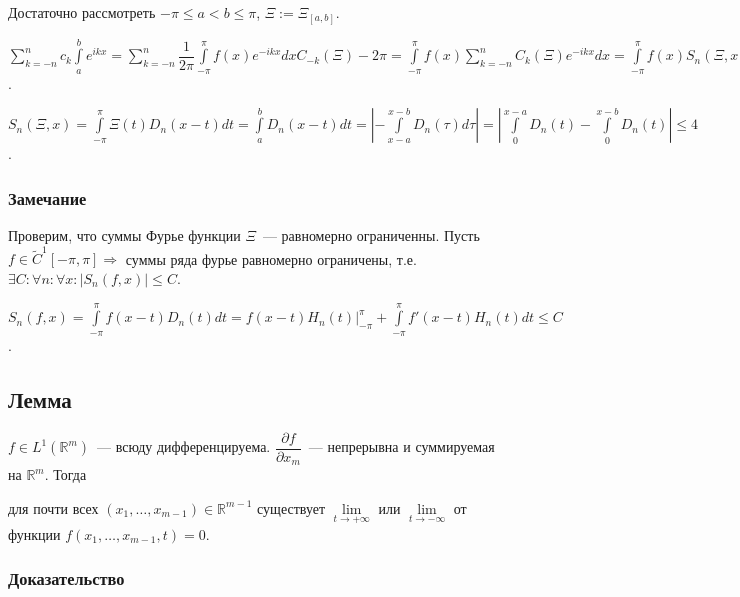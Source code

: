 \documentclass{article}
\begin{document}
            Достаточно рассмотреть $-\pi \leqslant a < b \leqslant \pi$, $\Xi := \Xi_{[a, b]}$.
            
            $\sum\limits_{k = -n}^n c_k \int\limits^b_a e^{ikx} = \sum\limits^n_{k = -n} \dfrac{1}{2 \pi} \int\limits^{\pi}_{-\pi} f(x) e^{-ikx} dx C_{-k} (\Xi) -2 \pi = \int\limits^{\pi}_{-\pi} f(x) \sum\limits_{k = -n}^n C_k(\Xi) e^{-ikx} dx = \int\limits^{\pi}_{-\pi} f(x) S_n(\Xi, x) dx = \int\limits^{\pi}_{-\pi} f(x) S_n(\Xi, x) dx \xrightarrow[n \rightarrow +\infty]{} \int\limits^b_a f(x) dx$.
            
            $S_n(\Xi, x) = \int\limits^{\pi}_{-\pi} \Xi(t) D_n(x - t) dt = \int\limits^b_a D_n(x - t) dt = \left| - \int\limits^{x - b}_{x - a} D_n(\tau) d \tau \right| = \left| \int\limits^{x - a}_0 D_n(t) - \int\limits^{x - b}_0 D_n(t) \right| \leqslant 4$.
            
        \subsubsection{Замечание}
        
            Проверим, что суммы Фурье функции $\Xi$~--- равномерно ограниченны. Пусть $f \in \widetilde{C}^1 [-\pi, \pi] \Rightarrow$ суммы ряда фурье равномерно ограничены, т.е. $\exists C : \forall n : \forall x : \left| S_n(f, x) \right| \leqslant C$.
            
            $S_n(f, x) = \int\limits^{\pi}_{-\pi} f(x - t) D_n(t) dt = f(x - t) H_n(t) \bigg|^{\pi}_{-\pi} + \int\limits^{\pi}_{-\pi} f'(x - t) H_n(t) dt \leqslant C$.
            
    \subsection{Лемма}
    
        $f \in L^1 \left( \mathbb{R}^m \right)$~--- всюду дифференцируема. $\dfrac{\partial f}{\partial x_m}$~--- непрерывна и суммируемая на $\mathbb{R}^m$. Тогда
        
        для почти всех $(x_1, \ldots, x_{m - 1}) \in \mathbb{R}^{m - 1}$ существует $\lim\limits_{t \rightarrow +\infty}$ или $\lim\limits_{t \rightarrow -\infty}$ от функции $f(x_1, \ldots, x_{m - 1}, t) = 0$.
        
        \subsubsection{Доказательство}
        
\end{document}
